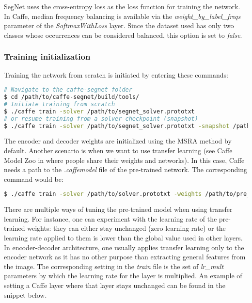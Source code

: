 
SegNet uses the cross-entropy loss as the loss function for training the network. In Caffe, median frequency balancing is available via the \textit{weight\_by\_label\_freqs} parameter of the \textit{SoftmaxWithLoss} layer. Since the dataset used has only two classes whose occurrences can be considered balanced, this option is set to \textit{false}. 

\subsubsection{Training initialization}

\noindent Training the network from scratch is initiated by entering these commands:

\begin{lstlisting}[language=bash]
# Navigate to the caffe-segnet folder
$ cd /path/to/caffe-segnet/build/tools/
# Initiate training from scratch
$ ./caffe train -solver /path/to/segnet_solver.prototxt
# or resume training from a solver checkpoint (snapshot)
$ ./caffe train -solver /path/to/segnet_solver.prototxt -snapshot /path/to/snapshot_iter_XY.solverstate
\end{lstlisting}

The encoder and decoder weights are initialized using the MSRA method by default. Another scenario is when we want to use transfer learning (see Caffe Model Zoo in \cite{caffe} where people share their weights and networks). In this case, Caffe needs a path to the \textit{.caffemodel} file of the pre-trained network. The corresponding command would be:

\begin{lstlisting}[language=bash]
$ ./caffe train -solver /path/to/solver.prototxt -weights /path/to/pre_trained_weights.caffemodel
\end{lstlisting}

There are multiple ways of tuning the pre-trained model when using transfer learning. For instance, one can experiment with the learning rate of the pre-trained weights: they can either stay unchanged (zero learning rate) or the learning rate applied to them is lower than the global value used in other layers. \cite{stanford-github} In encoder-decoder architecture, one usually applies transfer learning only to the encoder network as it has no other purpose than extracting general features from the image. The corresponding setting in the \textit{train} file is the set of \textit{lr\_mult} parameters by which the learning rate for the layer is multiplied. An example of setting a Caffe layer where that layer stays unchanged can be found in the snippet below.

